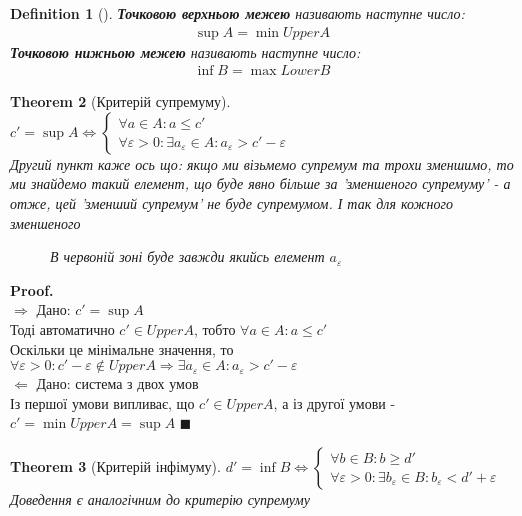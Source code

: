 \documentclass[a4paper, 14pt]{extarticle}
\def\bigline{\vspace{5mm}\\}
\def\rightproof{$\boxed{\Rightarrow}$ }
\def\leftproof{$\boxed{\Leftarrow}$ }
\theoremstyle{theoremdd}
\newtheorem{theorem}{Theorem}[subsection]
\theoremstyle{theoremdd}
\newtheorem{definition}[theorem]{Definition}
\theoremstyle{theoremdd}
\theoremstyle{theoremdd}
\theoremstyle{theoremdd}
\theoremstyle{theoremdd}
\theoremstyle{theoremdd}
\theoremstyle{theoremdd}
\newenvironment{pf}{\vspace*{-3mm} \textbf{Proof. \\}}{$\blacksquare$}
\begin{document}
	\begin{definition}[\hspace{0.1cm}]
	\textbf{Точковою верхньою межею} називають наступне число:
	\begin{align*}
	\sup A = \min UpperA
	\end{align*}
	\textbf{Точковою нижньою межею} називають наступне число:
	\begin{align*}
	\inf B = \max LowerB
	\end{align*}
	\end{definition}
	
	\begin{theorem}[Критерій супремуму]
	$c' = \sup A \iff \begin{cases} 
	 \forall a \in A: a \leq c' \\
	 \forall \varepsilon > 0: \exists a_{\varepsilon} \in A: a_{\varepsilon} > c' - \varepsilon
	\end{cases}$\\
	Другий пункт каже ось що: якщо ми візьмемо супремум та трохи зменшимо, то ми знайдемо такий елемент, що буде явно більше за 'зменшеного супремуму' - а отже, цей 'зменший супремум' не буде супремумом. І так для кожного зменшеного
	\begin{figure}[H]
	\centering
	\caption*{В червоній зоні буде завжди якийсь елемент $a_{\varepsilon}$}
	\end{figure}
	\end{theorem}
	\begin{pf}
	\rightproof Дано: $c' = \sup A$\\
	Тоді автоматично $c' \in UpperA$, тобто $\forall a \in A: a \leq c'$\\
	Оскільки це мінімальне значення, то\\ $\forall \varepsilon > 0: c' - \varepsilon \notin UpperA \Rightarrow \exists a_{\varepsilon} \in A: a_{\varepsilon} > c' - \varepsilon$
	\bigline
	\leftproof Дано: система з двох умов\\
	Із першої умови випливає, що  $c' \in UpperA$, а із другої умови - \\$c' = \min UpperA = \sup A$
	\end{pf}
	\begin{theorem}[Критерій інфімуму]
	$d' = \inf B \iff \begin{cases} 
	 \forall b \in B: b \geq d'\\
	 \forall \varepsilon > 0: \exists b_{\varepsilon} \in B: b_{\varepsilon} < d' + \varepsilon
	\end{cases}$\\
	\textit{Доведення є аналогічним до критерію супремуму}
	\end{theorem}
\end{document}
